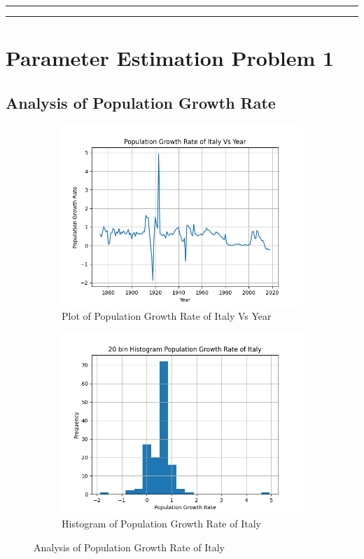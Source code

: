 \documentclass[fleqn, 11pt]{article}
\newcommand{\myline}{
    \par
    \kern3pt %
    \hrule height 0.5pt
    \kern2pt %
    \hrule height 0.5pt
    \kern3pt %
    \par
}
\begin{document}
\vspace{7pt}
\myline


\newpage
\section{Parameter Estimation Problem 1}
\setcounter{figure}{0}
\subsection{Analysis of Population Growth Rate}
\begin{figure}[H]
    \centering
    \begin{subfigure}[H]{0.49\textwidth}
        \centering
        \includegraphics[width=\textwidth]{P1/plot.png}
        \caption[]{Plot of Population Growth Rate of Italy Vs Year}
    \end{subfigure}
    \begin{subfigure}[H]{0.49\textwidth}
        \centering
        \includegraphics[width=\textwidth]{P1/hist.png}
        \caption[]{Histogram of Population Growth Rate of Italy}
    \end{subfigure}
    \caption{Analysis of Population Growth Rate of Italy}
\end{figure}
\end{document}

